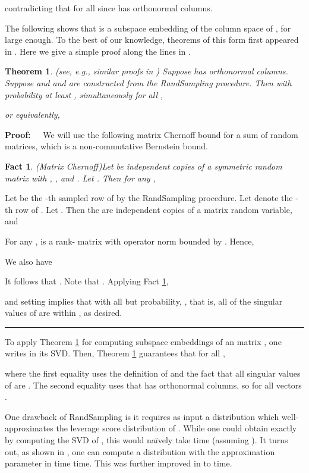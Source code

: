\documentclass[11pt]{article}
\newtheorem{theorem}{Theorem}
\newenvironment{proof}{\begin{trivlist} \item {\bf Proof:~~}}
  {\qed\end{trivlist}}
\def\qed{\hfill\rule{2mm}{2mm}}
\newtheorem{fact}{Fact}
\begin{document}
contradicting that  for all  since  has orthonormal columns. 

The following shows that  
is a subspace embedding of the column space of , for  large enough.
To the best of our knowledge, theorems of this form first appeared in \cite{DMM06c,DMM06d}. Here we give a simple
proof along the lines in \cite{Mag10}.   
\begin{theorem}\label{thm:lssPerf}(see, e.g., similar proofs in \cite{Mag10})
Suppose  has orthonormal columns. Suppose  
and  and 
are constructed from the {\textsc RandSampling} procedure. Then with probability
at least , simultaneously for all , 

or equivalently,

\end{theorem}

\begin{proof}
We will use the following matrix Chernoff bound for a sum of random matrices, 
which is a non-commutative Bernstein bound.

\begin{fact}(Matrix Chernoff)\label{fact:chernoff}
Let  be independent copies of a symmetric random matrix  
with , , and . 
Let . Then for any ,
 
\end{fact}
Let  be the -th sampled row of  by the 
{\textsc RandSampling} procedure.
Let
 denote the -th row of . 
Let . Then the  
are independent copies of a matrix random variable, and  

For any ,  is a rank- matrix with 
operator norm bounded by . Hence,

We also have

It follows that . 
Note that . 
Applying Fact \ref{fact:chernoff},

and setting  
implies that with all but  probability,
, 
that is, all of the singular values of  are within , as desired. 
\end{proof}
To apply Theorem \ref{thm:lssPerf} for computing subspace embeddings of an  matrix , one writes
 in its SVD. Then, Theorem \ref{thm:lssPerf} guarantees that for all ,

where the first equality uses the definition of  and the fact that all singular values of 
are . The second equality uses that  has orthonormal columns, so  for all
vectors . 

One drawback of {\textsc RandSampling} is it requires as 
input a distribution  which well-approximates the leverage
score distribution  of . While one could obtain  exactly by computing the SVD of , this would na\"ively take
 time (assuming ). It turns out, as shown in \cite{DMMW12}, one can compute a distribution  with the approximation
parameter  in time  time. This was further improved in \cite{CW13} to  time. 
\end{document}
